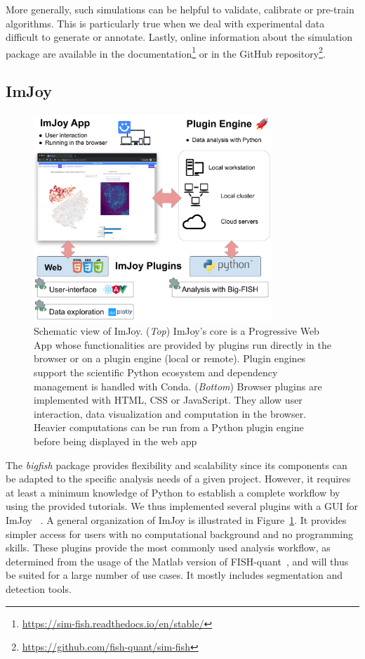 More generally, such simulations can be helpful to validate, calibrate or pre-train algorithms.
This is particularly true when we deal with experimental data difficult to generate or annotate.
Lastly, online information about the simulation package are available in the documentation\footnote{\url{https://sim-fish.readthedocs.io/en/stable/}} or in the GitHub repository\footnote{\url{https://github.com/fish-quant/sim-fish}}.

\subsection{ImJoy}
\label{subsec:imjoy}

\begin{figure}[]
    \centering
    \includegraphics[width=0.8\textwidth]{figures/chapter1/schema_imjoy}
    \caption[Schematic view of ImJoy]{Schematic view of ImJoy.
	(\textit{Top}) ImJoy's core is a Progressive Web App whose functionalities are provided by plugins run directly in the browser or on a plugin engine (local or remote).
	Plugin engines support the scientific Python ecosystem and dependency management is handled with Conda.
	(\textit{Bottom}) Browser plugins are implemented with HTML, CSS or JavaScript.
	They allow user interaction, data visualization and computation in the browser.
	Heavier computations can be run from a Python plugin engine before being displayed in the web app}
    \label{fig:imjoy}
\end{figure}

The \emph{bigfish} package provides flexibility and scalability since its components can be adapted to the specific analysis needs of a given project.
However, it requires at least a minimum knowledge of Python to establish a complete workflow by using the provided tutorials.
We thus implemented several plugins with a \ac{GUI} for ImJoy ~\cite{ouyang_imjoy_2019}.
A general organization of ImJoy is illustrated in Figure~\ref{fig:imjoy}.
It provides simpler access for users with no computational background and no programming skills.
These plugins provide the most commonly used analysis workflow, as determined from the usage of the Matlab version of FISH-quant~\cite{mueller_fish-quant_2013}, and will thus be suited for a large number of use cases.
It mostly includes segmentation and detection tools.

